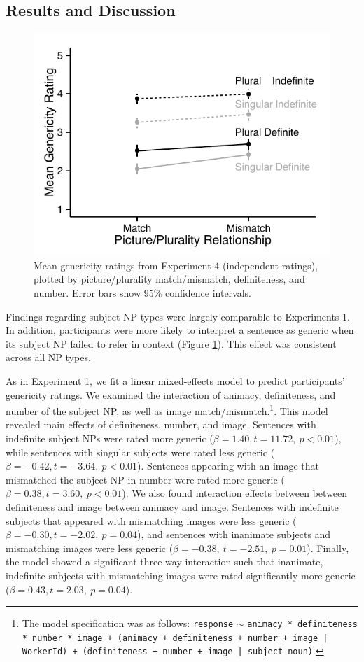 \documentclass[10pt,letterpaper]{article}
\begin{document}
\subsection{Results and Discussion}


\begin{figure}[t]
\centering
\includegraphics[width=.9\linewidth]{figures/e2b_mod.pdf}
\caption{\label{fig:e2b} Mean genericity ratings from Experiment 4 (independent ratings), plotted by picture/plurality match/mismatch, definiteness, and number. Error bars show 95\% confidence intervals.}
\end{figure}

Findings regarding subject NP types were largely comparable to Experiments 1. In addition, participants were more likely to interpret a sentence as generic when its subject NP failed to refer in context (Figure \ref{fig:e2b}). This effect was consistent across all NP types.

As in Experiment 1, we fit a linear mixed-effects model to predict participants' genericity ratings. We examined the interaction of animacy, definiteness, and number of the subject NP, as well as image match/mismatch.\footnote{The model specification was as follows: \texttt{response} \(\sim\) \texttt{animacy * definiteness * number * image + (animacy + definiteness + number + image | WorkerId) + (definiteness + number + image | subject noun)}.}. This model revealed main effects of definiteness, number, and image. Sentences with indefinite subject NPs were rated more generic (\(\beta = 1.40, t = 11.72,~p < 0.01\)), while sentences with singular subjects were rated less generic (\(\beta = -0.42, t = -3.64,~p < 0.01\)). Sentences appearing with an image that mismatched the subject NP in number were rated more generic (\(\beta = 0.38, t = 3.60,~p < 0.01\)). We also found interaction effects between between definiteness and image between animacy and image. Sentences with indefinite subjects that appeared with mismatching images were less generic (\(\beta = -0.30, t = -2.02,~p = 0.04\)), and sentences with inanimate subjects and mismatching images were less generic (\(\beta = -0.38,~t=-2.51,~p=0.01\)). Finally, the model showed a significant three-way interaction such that inanimate, indefinite subjects with mismatching images were rated significantly more generic (\(\beta = 0.43, t = 2.03,~p = 0.04\)).
\end{document}
